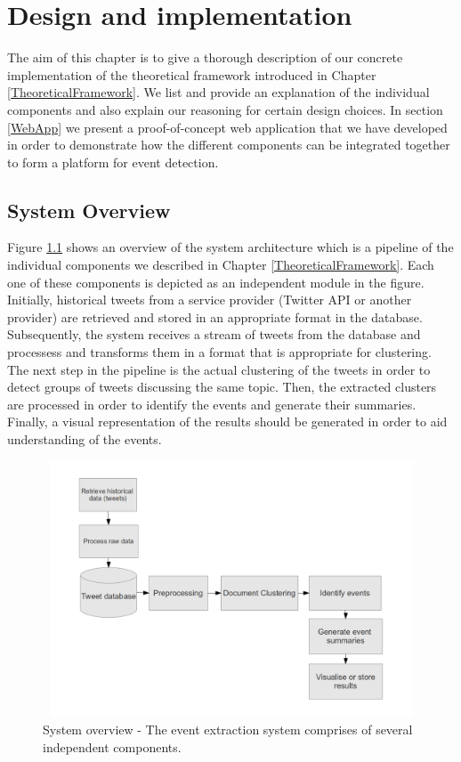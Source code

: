 \chapter{Design and implementation}\label{DesignAndImplementation}
\ifpdf
    \graphicspath{{Chapter3/Chapter3Figs/PNG/}{Chapter3/Chapter3Figs/PDF/}{Chapter3/Chapter3Figs/}}
\else
    \graphicspath{{Chapter3/Chapter3Figs/EPS/}{Chapter3/Chapter3Figs/}}
\fi

The aim of this chapter is to give a thorough description of our concrete implementation of the theoretical framework introduced
in Chapter \ref{TheoreticalFramework}. We list and provide an explanation of the individual
components and also explain our reasoning for certain design choices. In section \ref{WebApp} we present a proof-of-concept web application that 
we have developed in order to demonstrate how the different components can be integrated together to form a platform for event detection. 

\section{System Overview}
Figure \ref{SystemOverview} shows an overview of the system architecture which is a pipeline of the individual components we described
in Chapter \ref{TheoreticalFramework}. Each one of these components is depicted as an independent module in the figure.  
Initially, historical tweets from a service provider (Twitter API or another provider) are retrieved and stored in an 
appropriate format in the database. Subsequently, the system receives a stream of tweets from the database and processess and 
transforms them in a format that is appropriate for clustering. The next step in the pipeline is the actual clustering of the tweets 
in order to detect groups of tweets discussing the same topic. Then, the extracted clusters are processed in order to identify the events 
and generate their summaries. Finally, a visual representation of the results should be generated in order to aid understanding of the events.\\

\begin{figure}[htbp]
  \begin{center}
    \includegraphics[height=3in, width=6in]{system-overview}
    \caption{System overview - The event extraction system comprises of several independent components.}
    \label{SystemOverview}
  \end{center}
\end{figure}

